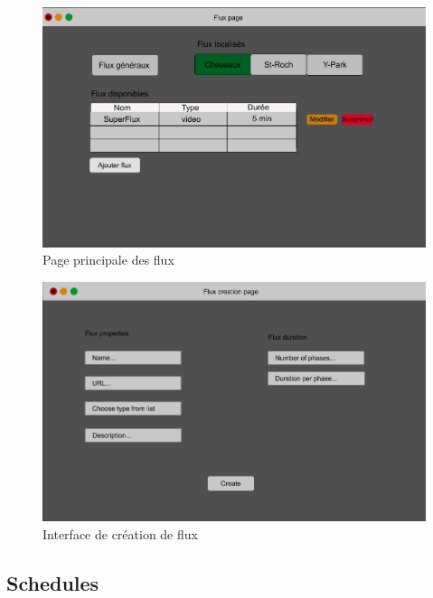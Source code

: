 \documentclass[french]{article}
\begin{document}
	\begin{figure}[h]
		\centering
		\includegraphics[scale=0.4]{mockup/m_flux_page}
		\caption{Page principale des flux}
		\label{fig:fluxPage}
	\end{figure}
	
	\begin{figure}[h]
		\centering
		\includegraphics[scale=0.4]{mockup/m_flux_creation}
		\caption{Interface de création de flux}
		\label{fig:fluxCreation}
	\end{figure}
	
\newpage
\subsection{Schedules}
\end{document}
